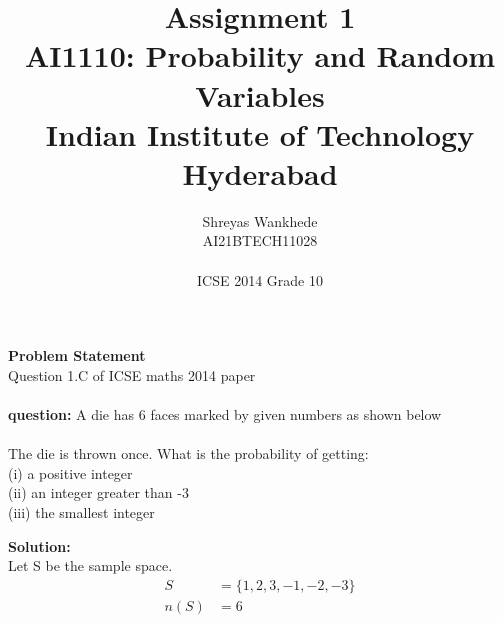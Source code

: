 \documentclass[journal,12pt,twocolumn]{IEEEtran}
\title{Assignment 1\\ \Large AI1110: Probability and Random Variables \\ \large Indian Institute of Technology Hyderabad}
\author{Shreyas Wankhede \\ \normalsize AI21BTECH11028 \\ \vspace*{20pt} \\ \Large ICSE 2014 Grade 10}
\begin{document}
\maketitle
\textbf{Problem Statement}\\
Question 1.C of ICSE maths 2014 paper\\\\
\textbf{question:}
A die has 6 faces marked by given numbers as shown below\\
\hspace{0.3cm}\hspace{0.3cm}\hspace{0.3cm}\hspace{0.3cm}\hspace{0.3cm}\\
The die is thrown once. What is the probability of getting:\\
(i)   a positive integer\\
(ii)  an integer greater than -3\\
(iii)  the smallest integer\\

\maketitle
\textbf{Solution: }\\
Let S be the sample space.
\begin{align}
S&=\{1,2,3,-1,-2,-3\}\\
n(S)&=6
\end{align}
\end{document}
